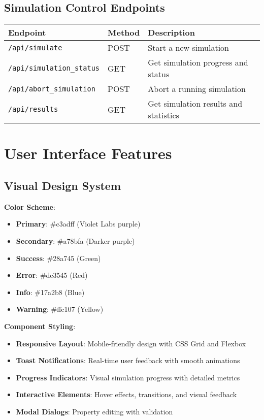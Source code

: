 \documentclass[12pt,a4paper]{article}
\begin{document}
\subsection{Simulation Control Endpoints}

\begin{longtable}{|p{3cm}|p{2cm}|p{8cm}|}
\hline
\textbf{Endpoint} & \textbf{Method} & \textbf{Description} \\
\hline
\endhead
\hline
\endfoot
\texttt{/api/simulate} & POST & Start a new simulation \\
\texttt{/api/simulation\_status} & GET & Get simulation progress and status \\
\texttt{/api/abort\_simulation} & POST & Abort a running simulation \\
\texttt{/api/results} & GET & Get simulation results and statistics \\
\hline
\end{longtable}

\section{User Interface Features}

\subsection{Visual Design System}

\textbf{Color Scheme}:
\begin{itemize}
    \item \textbf{Primary}: \#c3adff (Violet Labs purple)
    \item \textbf{Secondary}: \#a78bfa (Darker purple)
    \item \textbf{Success}: \#28a745 (Green)
    \item \textbf{Error}: \#dc3545 (Red)
    \item \textbf{Info}: \#17a2b8 (Blue)
    \item \textbf{Warning}: \#ffc107 (Yellow)
\end{itemize}

\textbf{Component Styling}:
\begin{itemize}
    \item \textbf{Responsive Layout}: Mobile-friendly design with CSS Grid and Flexbox
    \item \textbf{Toast Notifications}: Real-time user feedback with smooth animations
    \item \textbf{Progress Indicators}: Visual simulation progress with detailed metrics
    \item \textbf{Interactive Elements}: Hover effects, transitions, and visual feedback
    \item \textbf{Modal Dialogs}: Property editing with validation
\end{itemize}
\end{document}
